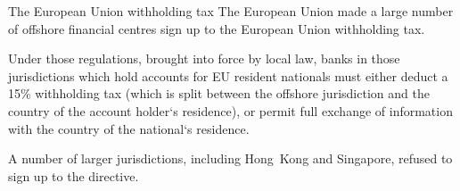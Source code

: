 \documentclass[international_finance_p2.tex]{subfiles}
\begin{document}
\begin{frame}{The European Union withholding tax}
The European Union made a large number of offshore financial centres sign up to the European Union withholding tax. 

Under those regulations, brought into force by local law, banks in those jurisdictions which hold accounts for EU resident nationals must either deduct a 15\% withholding tax (which is split between the offshore jurisdiction and the country of the account holder`s residence), or permit full exchange of information with the country of the national`s residence.

A number of larger jurisdictions, including Hong~Kong and Singapore, refused to sign up to the directive.
\end{frame}
\end{document}

